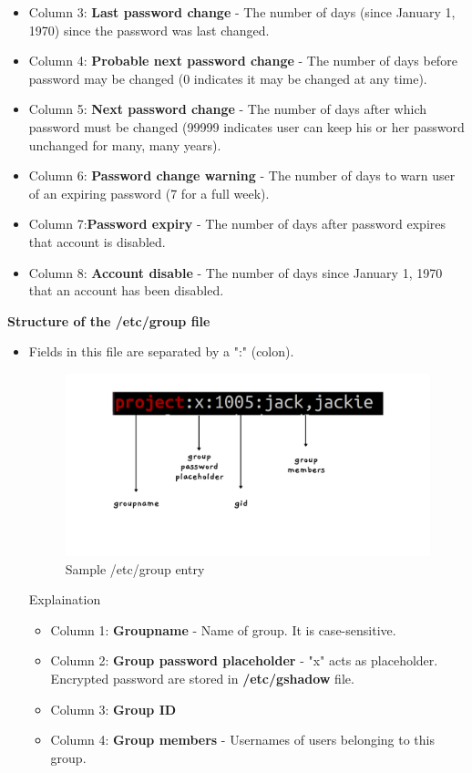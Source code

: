 \begin{flushleft}
\begin{itemize}
\begin{itemize}
		\item Column 3: \textbf{Last password change} - The number of days (since January 1, 1970) since the password was last changed.
		\item Column 4: \textbf{Probable next password change} - The number of days before password may be changed (0 indicates it may be changed at any time).
		\item Column 5: \textbf{Next password change} - The number of days after which password must be changed (99999 indicates user can keep his or her password unchanged for many, many years).
		\item Column 6: \textbf{Password change warning} - The number of days to warn user of an expiring password (7 for a full week).
		\item Column 7:\textbf{Password expiry} - The number of days after password expires that account is disabled.
		\item Column 8: \textbf{Account disable} - The number of days since January 1, 1970 that an account has been disabled.
	\end{itemize}	
\end{itemize}	
	
\newpage

\textbf{Structure of the /etc/group file}
\begin{itemize}
	\item Fields in this file are separated by a ":" (colon).
	\begin{figure}[h!]
		\centering
		\includegraphics[scale=.2]{content/chapter4/images/54.png}
		\caption{Sample /etc/group entry}
		\label{fig:user_group}
	\end{figure}	
	\newline
	Explaination
	\begin{itemize}
		\item Column 1: \textbf{Groupname} - Name of group. It is case-sensitive. 
		\item Column 2: \textbf{Group password placeholder} - "x" acts as placeholder. Encrypted password are stored in \textbf{/etc/gshadow} file.
		\item Column 3: \textbf{Group ID} 
		\item Column 4: \textbf{Group members} - Usernames of users belonging to this group.
	\end{itemize}	
\end{itemize}	


\end{flushleft}
